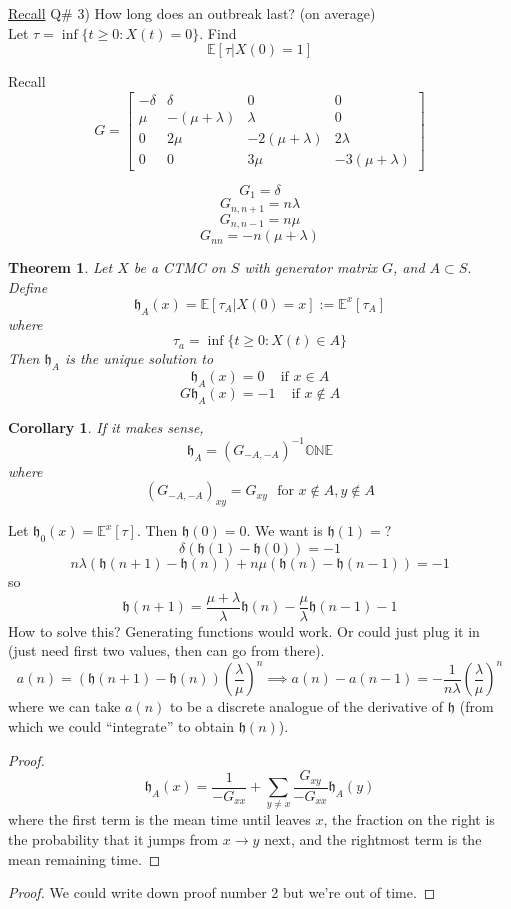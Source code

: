 \documentclass{article}
\newtheorem*{theorem*}{Theorem}
\newtheorem{corollary}{Corollary}[theorem]
\theoremstyle{definition}
\begin{document}
\underline{Recall} Q\# 3) How long does an outbreak last? (on average)\\
\noindent Let $\tau = \inf\{t\geq 0 : X(t) = 0\}$. Find 
$$\mathbb E[\tau | X(0) = 1]$$

Recall
$$G = \begin{bmatrix} -\delta & \delta & 0 & 0\\ \mu & -(\mu +\lambda) & \lambda & 0\\
0 & 2\mu & -2(\mu + \lambda) & 2\lambda\\
0 & 0 & 3\mu & -3(\mu +\lambda)
\end{bmatrix}
$$

$$G_1 = \delta$$
$$G_{n,n+1} = n\lambda$$
$$G_{n,n-1} = n\mu$$
$$G_{nn} = -n(\mu + \lambda)$$

\begin{theorem*}
Let $X$ be a CTMC on $S$ with generator matrix $G$, and $A\subset S$. Define $$\mathfrak{h}_A(x) = \mathbb E[\tau_A|X(0) = x] := \mathbb E^x[\tau_A]$$
where $$\tau_a = \inf\{t\geq 0:X(t)\in A\}$$
Then $\mathfrak h_A$ is the unique solution to 
$$\mathfrak h_A(x) = 0 \,\,\,\,\,\,\, \text{if } x\in A$$
$$G\mathfrak h_A(x) = -1 \,\,\,\,\,\,\, \text{if } x \notin A
$$
\end{theorem*}
\begin{corollary}
If it makes sense,
$$\mathfrak h_A = \left(G_{-A,-A}\right)^{-1}\mathbb{ONE}
$$
where 
$$(G_{-A,-A})_{xy} = G_{xy}\,\,\,\,\text{for }x\notin A, y\notin A$$
\end{corollary}
Let $\mathfrak h_0(x) = \mathbb E^x[\tau]$. Then $\mathfrak h(0) = 0$. We want is $\mathfrak h(1) = ?$
$$\delta(\mathfrak h(1) - \mathfrak h(0)) =-1
$$
$$n\lambda (\mathfrak h(n+1) - \mathfrak h(n)) + n \mu (\mathfrak h(n) - \mathfrak h(n-1)) = -1
$$
so 
$$\mathfrak h(n+1) = \dfrac{\mu + \lambda}{\lambda}\mathfrak h(n) - \dfrac{\mu}{\lambda}\mathfrak h(n-1) - 1
$$
How to solve this? Generating functions would work. Or could just plug it in (just need first two values, then can go from there).
$$a(n) = (\mathfrak h(n+1) - \mathfrak h(n))\left(\dfrac{\lambda}{\mu}\right)^n \implies a(n) - a(n-1) = -\dfrac{1}{n\lambda} \left(\dfrac{\lambda}{\mu}\right)^n
$$
where we can take $a(n)$ to be a discrete analogue of the derivative of $\mathfrak h$ (from which we could ``integrate'' to obtain $\mathfrak h(n)$).

\begin{proof}
$$\mathfrak h_A(x) = \dfrac{1}{-G_{xx}} + \sum_{y\neq x} \dfrac{G_{xy}}{-G_{xx}}\mathfrak h_A(y)
$$
where the first term is the mean time until leaves $x$, the fraction on the right is the probability that it jumps from $x\to y$ next, and the rightmost term is the mean remaining time.
\end{proof}
\begin{proof}
We could write down proof number 2 but we're out of time.
\end{proof}
\end{document}

